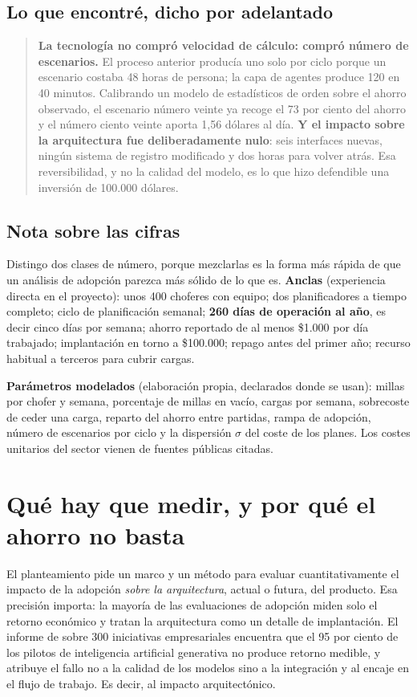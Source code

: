 \documentclass[11pt,letterpaper]{article}
\begin{document}
\subsection*{Lo que encontré, dicho por adelantado}

\begin{quote}
\textbf{La tecnología no compró velocidad de cálculo: compró número de
escenarios.} El proceso anterior producía uno solo por ciclo porque un
escenario costaba 48 horas de persona; la capa de agentes produce 120 en 40
minutos. Calibrando un modelo de estadísticos de orden sobre el ahorro
observado, el escenario número veinte ya recoge el 73 por ciento del ahorro y
el número ciento veinte aporta 1,56 dólares al día. \textbf{Y el impacto sobre
la arquitectura fue deliberadamente nulo}: seis interfaces nuevas, ningún
sistema de registro modificado y dos horas para volver atrás. Esa
reversibilidad, y no la calidad del modelo, es lo que hizo defendible una
inversión de 100.000 dólares.
\end{quote}

\subsection*{Nota sobre las cifras}

Distingo dos clases de número, porque mezclarlas es la forma más rápida de que
un análisis de adopción parezca más sólido de lo que es. \textbf{Anclas} (experiencia directa en el proyecto): unos 400 choferes con
equipo; dos planificadores a tiempo completo; ciclo de planificación semanal;
\textbf{260 días de operación al año}, es decir cinco días por semana; ahorro
reportado de al menos \$1.000 por día trabajado; implantación en torno a
\$100.000; repago antes del primer año; recurso habitual a terceros para
cubrir cargas.

\textbf{Parámetros modelados} (elaboración propia, declarados donde se usan):
millas por chofer y semana, porcentaje de millas en vacío, cargas por semana,
sobrecoste de ceder una carga, reparto del ahorro entre partidas, rampa de
adopción, número de escenarios por ciclo y la dispersión $\sigma$ del coste de
los planes. Los costes unitarios del sector vienen de fuentes públicas
citadas.

\section{Qué hay que medir, y por qué el ahorro no basta}

El planteamiento pide un marco y un método para evaluar cuantitativamente el
impacto de la adopción \emph{sobre la arquitectura}, actual o futura, del
producto. Esa precisión importa: la mayoría de las evaluaciones de adopción
miden solo el retorno económico y tratan la arquitectura como un detalle de
implantación. El informe de \textcite{nanda2025} sobre 300 iniciativas
empresariales encuentra que el 95 por ciento de los pilotos de inteligencia
artificial generativa no produce retorno medible, y atribuye el fallo no a la
calidad de los modelos sino a la integración y al encaje en el flujo de
trabajo. Es decir, al impacto arquitectónico.
\end{document}
